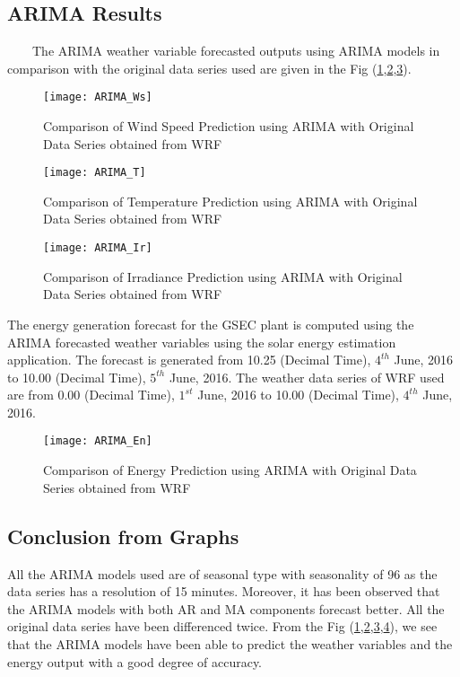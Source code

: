 \subsection{ARIMA Results}
\
\
\
\
The ARIMA weather variable forecasted outputs using ARIMA models in comparison with the original data series used are given in the Fig (\ref{figc7ARIMAWs},\ref{figc7ARIMAT},\ref{figc7ARIMAIr}).

\begin{figure}[H]
\centering
\texttt{[image: ARIMA\_Ws]}
\caption{Comparison of Wind Speed Prediction using ARIMA with Original Data Series obtained from WRF }
\label{figc7ARIMAWs} %
\end{figure}

\begin{figure}[H]
\centering
\texttt{[image: ARIMA\_T]}
\caption{Comparison of Temperature Prediction using ARIMA with Original Data Series obtained from WRF }
\label{figc7ARIMAT} %
\end{figure}

\begin{figure}[H]
\centering
\texttt{[image: ARIMA\_Ir]}
\caption{Comparison of Irradiance Prediction using ARIMA with Original Data Series obtained from WRF }
\label{figc7ARIMAIr} %
\end{figure}

The energy generation forecast for the GSEC plant is computed using the ARIMA forecasted weather variables using the solar energy estimation application. The forecast is generated from 10.25 (Decimal Time), $4^{th}$ June, 2016 to 10.00 (Decimal Time), $5^{th}$ June, 2016. The weather data series of WRF used are from 0.00 (Decimal Time), $1^{st}$ June, 2016 to 10.00 (Decimal Time), $4^{th}$ June, 2016.

\begin{figure}[H]
\centering
\texttt{[image: ARIMA\_En]}
\caption{Comparison of Energy Prediction using ARIMA with Original Data Series obtained from WRF }
\label{figc7ARIMAEn} %
\end{figure}

\newpage

\subsection{Conclusion from Graphs}

All the ARIMA models used are of seasonal type with seasonality of 96 as the data series has a resolution of 15 minutes. Moreover, it has been observed that the ARIMA models with both AR and MA components forecast better. All the original data series have been differenced twice. From the Fig (\ref{figc7ARIMAWs},\ref{figc7ARIMAT},\ref{figc7ARIMAIr},\ref{figc7ARIMAEn}), we see that the ARIMA models have been able to predict the weather variables and the energy output with a good degree of accuracy.
